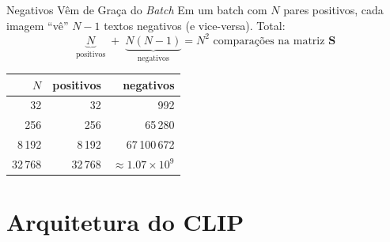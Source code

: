 \documentclass[aspectratio=169,xcolor=dvipsnames]{beamer}
\begin{document}
  \begin{frame}{Negativos Vêm de Graça do \textit{Batch}}
    Em um batch com $N$ pares positivos, cada imagem ``vê'' $N{-}1$ textos negativos
    (e vice-versa). Total:
    \[
      \underbrace{N}_{\text{positivos}} \;+\; \underbrace{N(N{-}1)}_{\text{negativos}}
      = N^2 \text{ comparações na matriz } \mathbf{S}
    \]

    \vspace{0.3em}
    \centering
    \begin{tabular}{@{}rrr@{}}
      \toprule
      $N$ & positivos & negativos \\
      \midrule
      32        & 32        & 992 \\
      256       & 256       & 65\,280 \\
      8\,192    & 8\,192    & 67\,100\,672 \\
      32\,768   & 32\,768   & $\approx 1.07 \times 10^9$ \\
      \bottomrule
    \end{tabular}

  \end{frame}

  \section{Arquitetura do CLIP}
\end{document}
